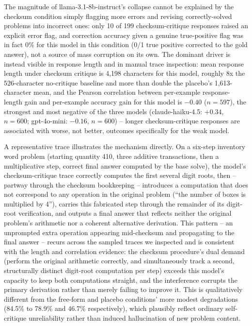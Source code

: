 \documentclass[11pt,letterpaper]{article}
\begin{document}
The magnitude of llama-3.1-8b-instruct's collapse cannot be explained by the checksum condition simply flagging more errors and revising correctly-solved problems into incorrect ones: only 10 of 199 checksum-critique responses raised an explicit error flag, and correction accuracy given a genuine true-positive flag was in fact 0\% for this model in this condition (0/1 true positive corrected to the gold answer), not a source of mass corruption on its own. The dominant driver is instead visible in response length and in manual trace inspection: mean response length under checksum critique is 4,198 characters for this model, roughly 8x the 526-character no-critique baseline and more than double the placebo's 1,613-character mean, and the Pearson correlation between per-example response-length gain and per-example accuracy gain for this model is $-0.40$ ($n=597$), the strongest and most negative of the three models (claude-haiku-4.5: $+0.34$, $n=600$; gpt-4o-mini: $-0.16$, $n=600$) -- longer checksum-critique responses are associated with worse, not better, outcomes specifically for the weak model.

A representative trace illustrates the mechanism directly. On a six-step inventory word problem (starting quantity 410, three additive transactions, then a multiplicative step, correct final answer computed by the base solve), the model's checksum-critique trace correctly computes the first several digit roots, then -- partway through the checksum bookkeeping -- introduces a computation that does not correspond to any operation in the original problem (``the number of boxes is multiplied by 4''), carries this fabricated step through the remainder of its digit-root verification, and outputs a final answer that reflects neither the original problem's arithmetic nor a coherent alternative derivation. This pattern -- an unprompted extra operation appearing mid-checksum and propagating to the final answer -- recurs across the sampled traces we inspected and is consistent with the length and correlation evidence: the checksum procedure's dual demand (perform the original arithmetic correctly, and simultaneously track a second, structurally distinct digit-root computation per step) exceeds this model's capacity to keep both computations straight, and the interference corrupts the primary derivation rather than merely failing to improve it. This is qualitatively different from the free-form and placebo conditions' more modest degradations (84.5\% to 78.9\% and 46.7\% respectively), which plausibly reflect ordinary self-critique unreliability rather than induced hallucination of new problem content.
\end{document}
